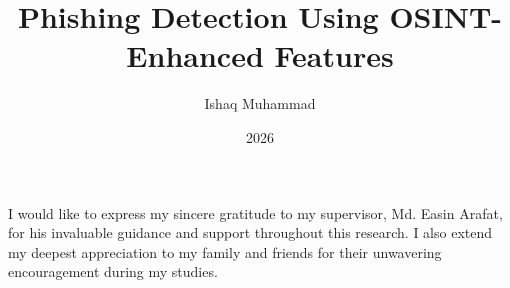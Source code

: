 \documentclass[
]{elteikthesis}[2024/04/26]
\title{Phishing Detection Using OSINT-Enhanced Features} %
\date{2026} %
\author{Ishaq Muhammad}
\affiliation{Assistant Lecturer} %
\begin{document}


\maketitle


\cleardoublepage


\tableofcontents
\cleardoublepage


\cleardoublepage

\cleardoublepage

\cleardoublepage

\cleardoublepage

\cleardoublepage

\cleardoublepage

\chapter*{\acklabel}
I would like to express my sincere gratitude to my supervisor, Md. Easin Arafat, for his invaluable guidance and support throughout this research. I also extend my deepest appreciation to my family and friends for their unwavering encouragement during my studies.

\appendix
\cleardoublepage

{}
\printbibliography[title=\biblabel]
\cleardoublepage

{}
\listoffigures
\cleardoublepage

\cleardoublepage




\end{document}
